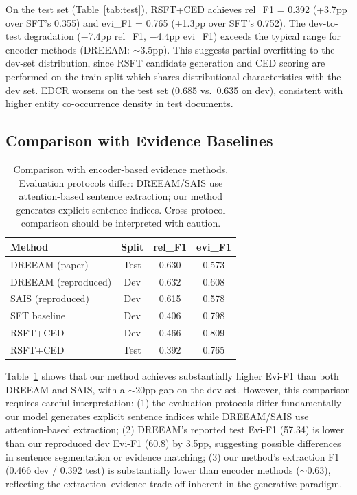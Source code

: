 \documentclass[11pt,a4paper]{article}
\begin{document}
On the test set (Table~\ref{tab:test}), RSFT+CED achieves rel\_F1 = 0.392 (+3.7pp over SFT's 0.355) and evi\_F1 = 0.765 (+1.3pp over SFT's 0.752).
The dev-to-test degradation ($-$7.4pp rel\_F1, $-$4.4pp evi\_F1) exceeds the typical range for encoder methods (DREEAM: $\sim$3.5pp).
This suggests partial overfitting to the dev-set distribution, since RSFT candidate generation and CED scoring are performed on the train split which shares distributional characteristics with the dev set.
EDCR worsens on the test set (0.685 vs.\ 0.635 on dev), consistent with higher entity co-occurrence density in test documents.

\subsection{Comparison with Evidence Baselines}

\begin{table}[t]
\centering
\caption{Comparison with encoder-based evidence methods. Evaluation protocols differ: DREEAM/SAIS use attention-based sentence extraction; our method generates explicit sentence indices. Cross-protocol comparison should be interpreted with caution.}
\label{tab:baseline_comparison}
\small
\begin{tabular}{lccc}
\toprule
\textbf{Method} & \textbf{Split} & \textbf{rel\_F1} & \textbf{evi\_F1} \\
\midrule
DREEAM (paper)        & Test & 0.630 & 0.573 \\
DREEAM (reproduced)   & Dev  & 0.632 & 0.608 \\
SAIS (reproduced)     & Dev  & 0.615 & 0.578 \\
\midrule
SFT baseline          & Dev  & 0.406 & 0.798 \\
RSFT+CED              & Dev  & 0.466 & 0.809 \\
RSFT+CED              & Test & 0.392 & 0.765 \\
\bottomrule
\end{tabular}
\end{table}

Table~\ref{tab:baseline_comparison} shows that our method achieves substantially higher Evi-F1 than both DREEAM and SAIS, with a $\sim$20pp gap on the dev set.
However, this comparison requires careful interpretation: (1) the evaluation protocols differ fundamentally---our model generates explicit sentence indices while DREEAM/SAIS use attention-based extraction; (2) DREEAM's reported test Evi-F1 (57.34) is lower than our reproduced dev Evi-F1 (60.8) by 3.5pp, suggesting possible differences in sentence segmentation or evidence matching; (3) our method's extraction F1 (0.466 dev / 0.392 test) is substantially lower than encoder methods ($\sim$0.63), reflecting the extraction--evidence trade-off inherent in the generative paradigm.
\end{document}
